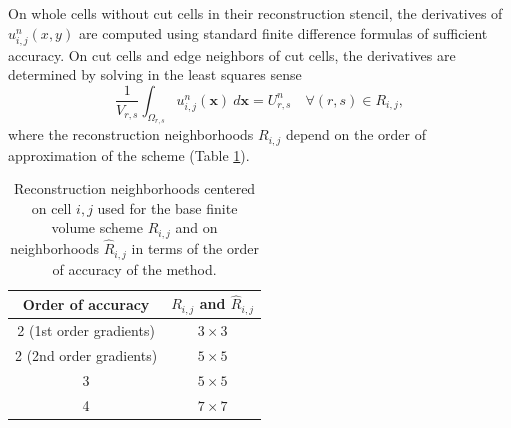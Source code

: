 On whole cells without cut cells in their reconstruction stencil, the derivatives of $u^n_{i,j}(x,y)$ are computed using standard finite difference formulas of sufficient accuracy.
On cut cells and edge neighbors of cut cells, the derivatives are determined by solving in the least squares sense
\begin{equation}\label{eq:ls_base}
\frac{1}{V_{r,s}}\int_{\Omega_{r,s}} u^n_{i,j}(\mathbf{x})~d\mathbf{x} = U^n_{r,s} \quad \forall (r,s) \in R_{i,j},
\end{equation}
where the reconstruction neighborhoods $R_{i,j}$ depend on the order of approximation of the scheme (Table \ref{tab:reconneigh}).
\begin{table}
	\centering
	\begin{tabular}{|c|c|}
		\hline 
		Order of accuracy & $R_{i,j}$ and $\hat R_{i,j}$ \\
		\hline
		2 (1st order gradients) &  $3 \times 3 $ \\
		\hline
		2 (2nd order gradients) &  $5 \times 5 $ \\
		\hline
		3 & $5 \times 5$ \\
		\hline
		4 & $7 \times 7$ \\
		\hline
	\end{tabular} 
	\caption{Reconstruction neighborhoods centered on cell $i,j$ used for the base finite volume scheme $R_{i,j}$ and on neighborhoods $\widehat{R}_{i,j}$ in terms of the 
        order of accuracy of the method.   
} \label{tab:reconneigh}
\end{table}

